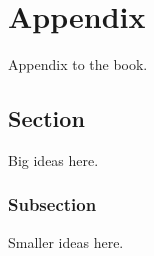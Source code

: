 

\chapter{Appendix}
\label{appendix}

Appendix to the book.
\section{Section}
Big ideas here.
\subsection{Subsection}
Smaller ideas here.




~                 
